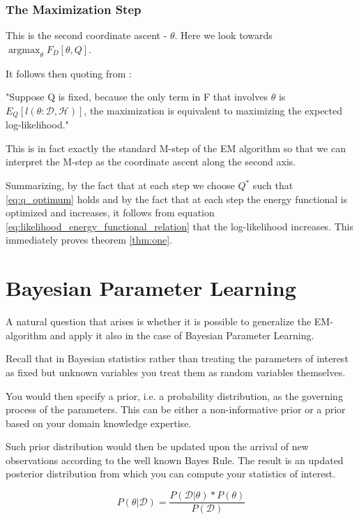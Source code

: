 \documentclass[11pt]{article}
\begin{document}
\begin{article}
\subsubsection{The Maximization Step}
\label{sec:org2aae784}

This is the second coordinate ascent - \(\theta\). Here we look
towards \(\operatorname*{argmax}_{\theta} F_D[\theta, Q]\).

It follows then quoting from
\cite{koller2009probabilistic}:

"Suppose Q is fixed, because the only term in F that involves \(\theta\) is
\(E_Q[l (\theta: \mathscr{D}, \mathscr{H})]\), the maximization is
equivalent to maximizing the expected log-likelihood."

This is in fact exactly the standard M-step of the EM algorithm so
that we can interpret the M-step as the coordinate ascent along
the second axis. 

Summarizing, by the fact that at each step we choose \(Q^*\) such
that \ref{eq:q_optimum} holds and by the fact that at each step the
energy functional is optimized and increases, it follows from
equation \ref{eq:likelihood_energy_functional_relation} that the
log-likelihood increases. This immediately proves theorem
\ref{thm:one}.

\newpage

\section{Bayesian Parameter Learning}
\label{bayes-parameter-learning}
A natural question that arises is whether it is possible to
generalize the EM-algorithm and apply it also in the case of
Bayesian Parameter Learning.

Recall that in Bayesian statistics rather than treating the
parameters of interest as fixed but unknown variables you treat
them as random variables themselves.

You would then specify a prior, i.e. a probability distribution, as
the governing process of the parameters. This can be either a
non-informative prior or a prior based on your domain knowledge
expertise.

Such prior distribution would then be updated upon the arrival of
new observations according to the well known Bayes Rule. The result
is an updated posterior distribution from which you can compute your
statistics of interest.


\begin{equation} \label{eq:bayes_formula}
P (\theta | \mathscr{D}) = \frac{P (\mathscr{D} | \theta) * P(\theta)}{P (\mathscr{D})} 
\end{equation}


\end{article}
\end{document}
